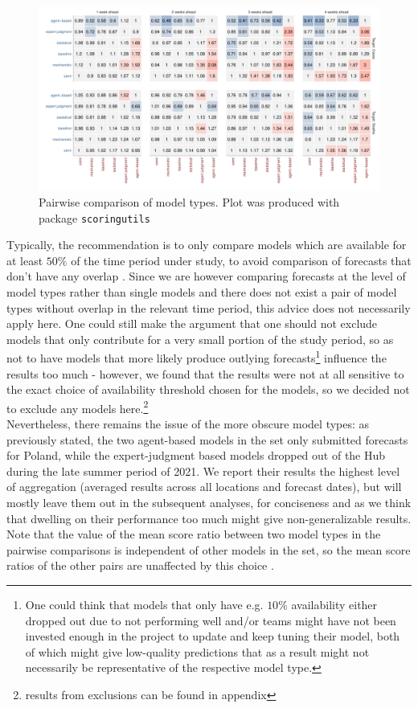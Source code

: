 \begin{figure}
\centering
\includegraphics[width = \textwidth]{../plots/pw_comp_model_type_with_other_wide.pdf}
\caption{Pairwise comparison of model types. Plot was produced with package \texttt{scoringutils}}
\label{fig:pw_comp_modeltypes}
\end{figure}
Typically, the recommendation is to only compare models which are available for at least $50\% $ of the time period under study, to avoid comparison of forecasts that don't have any overlap \citep{bosse_epiforecastsscoringutils_2022}. Since we are however comparing forecasts at the level of model types rather than single models and there does not exist a pair of model types without overlap in the relevant time period, this advice does not necessarily apply here. One could still make the argument that one should not exclude models that only contribute for a very small portion of the study period, so as not to have models that more likely produce outlying forecasts\footnote{One could think that models that only have e.g. $10\%$ availability either dropped out due to not performing well and/or teams might have not been invested enough in the project to update and keep tuning their model, both of which might give low-quality predictions that as a result might not necessarily be representative of the respective model type.} influence the results too much - however, we found that the results were not at all sensitive to the exact choice of availability threshold chosen for the models, so we decided not to exclude any models here.\footnote{results from exclusions can be found in appendix} \\ 
Nevertheless, there remains the issue of the more obscure model types: as previously stated, the two agent-based models in the set only submitted forecasts for Poland, while the expert-judgment based models dropped out of the Hub during the late summer period of 2021. We report their results the highest level of aggregation (averaged results across all locations and forecast dates), but will mostly leave them out in the subsequent analyses, for conciseness and as we think that dwelling on their performance too much might give non-generalizable results. Note that the value of the mean score ratio between two model types in the pairwise comparisons is independent of other models in the set, so the mean score ratios of the other pairs are unaffected by this choice .\\

